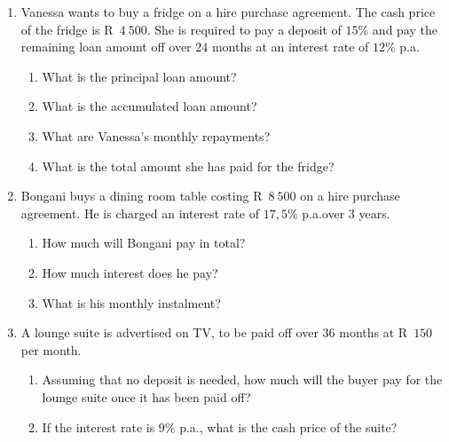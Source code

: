 \begin{exercises}{}{
    \begin{enumerate}[label=\textbf{\arabic*}.]
	\item Vanessa wants to buy a fridge on a hire purchase agreement. The cash price of the fridge is R~$4~500$. She is required to pay a deposit of $15\%$ and pay the remaining loan amount off over $24$ months at an interest rate of $12\%$ p.a.
	\begin{enumerate}[noitemsep, label=\textbf{(\alph*)} ]
	    \item What is the principal loan amount?
	    \item What is the accumulated loan amount?
	    \item What are Vanessa's monthly repayments?
	    \item What is the total amount she has paid for the fridge?
	\end{enumerate}
	\item Bongani buys a dining room table costing R~$8~500$ on a
          hire purchase agreement. He is charged an interest rate of
          $17,5\%$ p.a.over $3$ years.
	\begin{enumerate}[noitemsep, label=\textbf{(\alph*)} ]
	    \item How much will Bongani pay in total?
	    \item How much interest does he pay?
	    \item What is his monthly instalment?
	\end{enumerate}
	\item A lounge suite is advertised on TV, to be paid off over $36$ months at R~$150$ per month.
	\begin{enumerate}[noitemsep, label=\textbf{(\alph*)} ]
	    \item Assuming that no deposit is needed, how much will the buyer pay for the lounge suite once it has been paid off?
	    \item If the interest rate is $9\%$ p.a., what is the cash price of the suite?\\
	\end{enumerate}
    \end{enumerate}
}
\end{exercises}


